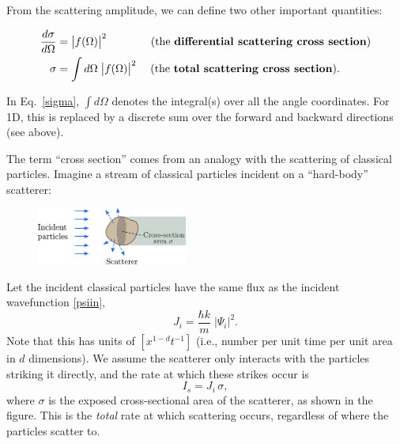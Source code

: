 \documentclass[pra,12pt]{revtex4-2}
\begin{document}
From the scattering amplitude, we can define two other important
quantities:
\begin{framed}
  \begin{align}
    \frac{d\sigma}{d\Omega} &= \big|f(\Omega)\big|^2 \qquad\quad\quad \text{(the \textbf{differential scattering cross section})} \\ \sigma &= \int d\Omega\; \big|f(\Omega)\big|^2 \quad\; \text{(the \textbf{total scattering cross section}).} \label{sigma}
  \end{align}
\end{framed}
\vskip -0.1in
\noindent
In Eq.~\eqref{sigma}, $\int d\Omega$ denotes the integral(s) over all
the angle coordinates.  For 1D, this is replaced by a discrete sum
over the forward and backward directions (see above).

The term ``cross section'' comes from an analogy with the scattering
of classical particles.  Imagine a stream of classical particles
incident on a ``hard-body'' scatterer:

\begin{figure}[h]
  \centering\includegraphics[width=0.44\textwidth]{crosssection}
\end{figure}

\noindent
Let the incident classical particles have the same flux as the
incident wavefunction \eqref{psiin},
\begin{equation}
  J_{i} = \frac{\hbar k}{m} \;|\Psi_i|^2.
  \label{incidentflux}
\end{equation}
Note that this has units of $[x^{1-d}t^{-1}]$ (i.e., number per unit
time per unit area in $d$ dimensions).  We assume the scatterer only
interacts with the particles striking it directly, and the rate at
which these strikes occur is
\begin{equation}
  I_s = J_i \, \sigma,
  \label{scattersigma}
\end{equation}
where $\sigma$ is the exposed cross-sectional area of the scatterer,
as shown in the figure.  This is the \textit{total} rate at which
scattering occurs, regardless of where the particles scatter to.
\end{document}
